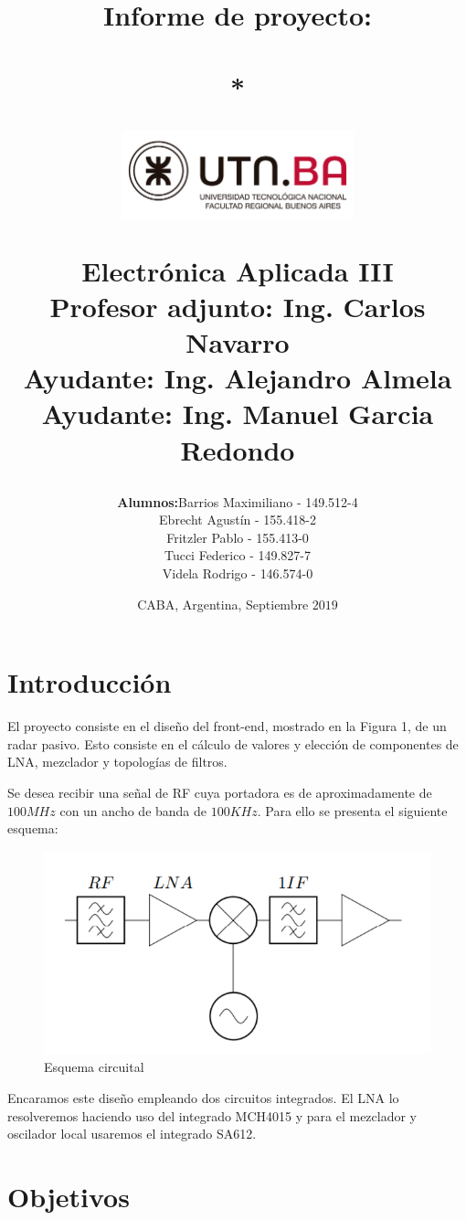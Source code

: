 \documentclass{article}
\author{\begin{tabular}{rl}
  \textbf{Alumnos:} & Barrios Maximiliano - {149.512-4} \\ & Ebrecht Agustín {- {155.418-2} }\\ & Fritzler Pablo {- {155.413-0} }\\ & Tucci Federico{ - {149.827-7} }\\ & Videla Rodrigo{ - {146.574-0}}
\end{tabular}}
\title{{\Huge \textbf{Informe de proyecto:}}\\\vspace{10px}{Proyecto de Laboratorio}\\*
\begin{figure}[h]
\centering
\vspace{20px}
\includegraphics[width=0.6\textwidth]{UTN}
\end{figure} 
\vspace{20px}
Electrónica Aplicada III\\[0.5cm] 
\vspace{25px}
Profesor adjunto: Ing. Carlos Navarro\\
Ayudante: Ing. Alejandro Almela\\
Ayudante: Ing. Manuel Garcia Redondo
\vspace{25px}
\date{\vspace{40px}CABA, Argentina, Septiembre $2019$}
}
\begin{document}
\maketitle
\thispagestyle{empty}

\onecolumn
\tableofcontents{}
\thispagestyle{empty}
\clearpage
\newpage 

\setcounter{page}{1}

\section{Introducción}

El proyecto consiste en el diseño del front-end, mostrado en la Figura 1, de un radar pasivo. Esto consiste en el cálculo de valores y elección de componentes de LNA, mezclador y topologías de filtros.

Se desea recibir una señal de RF cuya portadora es de aproximadamente de $100 MHz$ con un ancho de banda de $100 KHz$. Para ello se presenta el siguiente esquema:

\begin{figure}[H]
  \centering
    \includegraphics[scale=0.7]{esquema_circuital}
  \caption{Esquema circuital}
\end{figure}

Encaramos este diseño empleando dos circuitos integrados. El LNA lo resolveremos haciendo uso del integrado MCH4015 y para el mezclador y oscilador local usaremos el integrado SA612.

\section{Objetivos}
\end{document}

